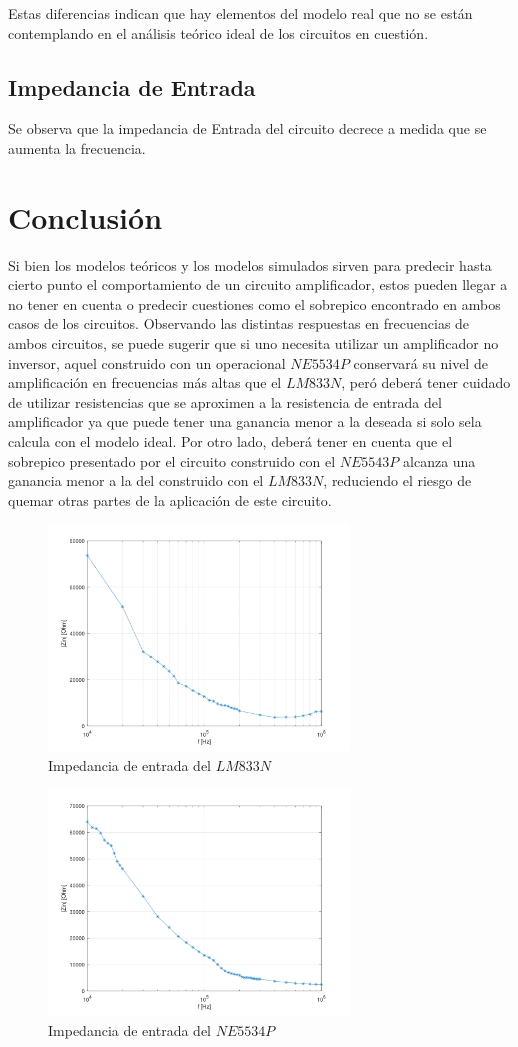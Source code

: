 Estas diferencias indican que hay elementos del modelo real que no se están contemplando en el análisis teórico ideal de los circuitos en cuestión.

\subsection{Impedancia de Entrada}
Se observa que la impedancia de Entrada del circuito decrece a medida que se aumenta la frecuencia.

\section{Conclusión}
Si bien los modelos teóricos y los modelos simulados sirven para predecir hasta cierto punto el comportamiento de un circuito amplificador, estos pueden llegar a no tener en cuenta o predecir cuestiones como el sobrepico encontrado en ambos casos de los circuitos.
Observando las distintas respuestas en frecuencias de ambos circuitos, se puede sugerir que si uno necesita utilizar un amplificador no inversor, aquel construido con un operacional $NE5534P$ conservará su nivel de amplificación en frecuencias más altas que el $LM833N$, peró deberá tener cuidado de utilizar resistencias que se aproximen a la resistencia de entrada del amplificador ya que puede tener una ganancia menor a la deseada si solo sela calcula con el modelo ideal.
Por otro lado, deberá tener en cuenta que el sobrepico presentado por el circuito construido con el $NE5543P$ alcanza una ganancia menor a la del construido con el $LM833N$, reduciendo el riesgo de quemar otras partes de la aplicación de este circuito.

\begin{figure}[h]
\begin{center}
\includegraphics[height=6cm]{./rsc/lm_proto_zin.png}
\caption{Impedancia de entrada del $LM833N$}
\label{fig:e2_lm_proto_zin}
\end{center}
\end{figure}

\begin{figure}[h]
\begin{center}
\includegraphics[height=6cm]{./rsc/ne_proto_zin.png}
\caption{Impedancia de entrada del $NE5534P$}
\label{fig:e2_ne_proto_zin}
\end{center}
\end{figure}